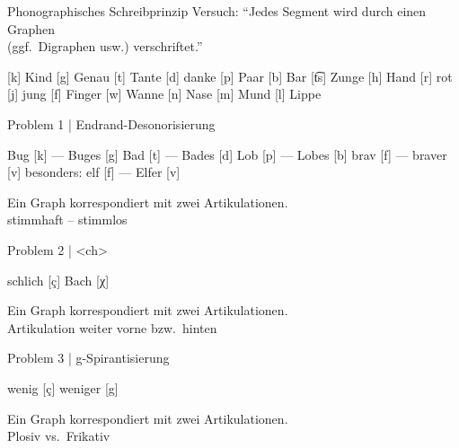 \begin{frame}
  {Phonographisches Schreibprinzip}
  \onslide<+->
  \onslide<+->
  Versuch: "`Jedes Segment wird durch einen Graphen\\
  (ggf.\ Digraphen usw.) verschriftet."'\\
  \onslide<+->
  \Zeile
  \begin{exe}
    \ex{} [k] \alert{K}ind [g] \alert{G}enau
    \ex{} [t] \alert{T}ante [d] \alert{d}anke
    \ex{} [p] \alert{P}aar [b] \alert{B}ar 
    \ex{} [t͡s] \alert{Z}unge
    \ex{} [h] \alert{H}and [r] \alert{r}ot [j] \alert{j}ung [f] \alert{F}inger [w] \alert{W}anne
    \ex{} [n] \alert{N}ase [m] \alert{M}und [l] \alert{L}ippe
  \end{exe}
\end{frame}


\begin{frame}
  {Problem 1 | Endrand-Desonorisierung}
  \onslide<+->
  \onslide<+->
  \begin{exe}
    \ex Bu\alert{g} [k] --- Bu\alert{g}es [g]
    \ex Ba\alert{d} [t] --- Ba\alert{d}es [d]
    \ex Lo\alert{b} [p] --- Lo\alert{b}es [b]
    \ex bra\alert{v} [f] --- bra\alert{v}er [v]
    \Halbzeile
    \ex besonders: el\alert{f} [f] --- El\alert{f}er [v]
  \end{exe}
  \onslide<+->
  \Zeile
  \alert{Ein Graph} korrespondiert mit \alert{zwei Artikulationen}.\\
  \alert{stimmhaft -- stimmlos} 
\end{frame}


\begin{frame}
  {Problem 2 | <ch>}
  \onslide<+->
  \onslide<+->
  \begin{exe}
    \ex schli\alert{ch} [ç]
    \ex Ba\alert{ch} [χ]
  \end{exe}
  \onslide<+->
  \Zeile
  \alert{Ein Graph} korrespondiert mit \alert{zwei Artikulationen}.\\
  \alert{Artikulation weiter vorne bzw.\ hinten} 
\end{frame}

\begin{frame}
  {Problem 3 | g-Spirantisierung}
  \onslide<+->
  \onslide<+->
  \begin{exe}
    \ex weni\alert{g} [ç]
    \ex weni\alert{g}er [g]
  \end{exe}
  \onslide<+->
  \Zeile
  \alert{Ein Graph} korrespondiert mit \alert{zwei Artikulationen}.\\
  \alert{Plosiv vs.\ Frikativ} 
\end{frame}

